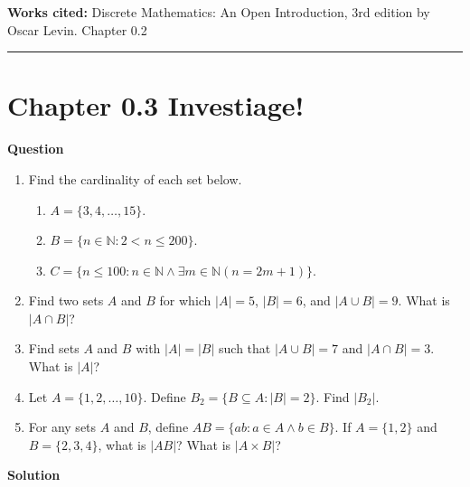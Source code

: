 \documentclass{article}
\begin{document}
\vspace{0.5cm}
\textbf{Works cited:}
Discrete Mathematics: An Open Introduction, 3rd edition by Oscar Levin. Chapter 0.2

\vspace{0.5cm}
\hrule
\vspace{0.5cm}

\section*{Chapter 0.3 Investiage!} 

\textbf{Question}

\begin{enumerate}
    \item Find the cardinality of each set below.
    \begin{enumerate}
        \item \( A = \{3, 4, \ldots, 15\} \).
        \item \( B = \{n \in \mathbb{N} : 2 < n \leq 200\} \).
        \item \( C = \{n \leq 100 : n \in \mathbb{N} \land \exists m \in \mathbb{N}(n = 2m + 1)\} \).
    \end{enumerate}
    
    \item Find two sets \( A \) and \( B \) for which \( |A| = 5 \), \( |B| = 6 \), and \( |A \cup B| = 9 \). What is \( |A \cap B| \)?
    
    \item Find sets \( A \) and \( B \) with \( |A| = |B| \) such that \( |A \cup B| = 7 \) and \( |A \cap B| = 3 \). What is \( |A| \)?
    
    \item Let \( A = \{1, 2, \ldots, 10\} \). Define \( B_2 = \{B \subseteq A : |B| = 2\} \). Find \( |B_2| \).
    
    \item For any sets \( A \) and \( B \), define \( AB = \{ab : a \in A \land b \in B\} \). If \( A = \{1, 2\} \) and \( B = \{2, 3, 4\} \), what is \( |AB| \)? What is \( |A \times B| \)?
\end{enumerate}

\textbf{Solution}
\end{document}
